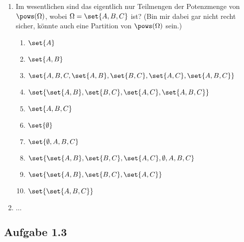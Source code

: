 \begin{lösung}
	\begin{enumerate}
		\item Im wesentlichen sind das eigentlich nur Teilmengen der Potenzmenge von $\pows(\Omega)$, wobei $\Omega = \set{A,B,C}$ ist? (Bin mir dabei gar nicht recht sicher, könnte auch eine Partition von $\pows(\Omega)$ sein.)
		\begin{enumerate}
			\item $\set{A}$
			\item $\set{A,B}$
			\item $\set{A,B,C, \set{A,B}, \set{B,C}, \set{A,C}, \set{A,B,C}}$
			\item $\set{\set{A,B}, \set{B,C}, \set{A,C}, \set{A,B,C}}$
			\item $\set{A,B,C}$
			\item $\set{\emptyset}$
			\item $\set{\emptyset, A, B, C}$
			\item $\set{\set{A,B}, \set{B,C}, \set{A,C}, \emptyset, A,B,C}$
			\item $\set{\set{A,B}, \set{B,C}, \set{A,C}}$
			\item $\set{\set{A,B,C}}$
		\end{enumerate}
	\item $\dots$ %
	\end{enumerate}
\end{lösung}

\subsection{Aufgabe 1.3}

